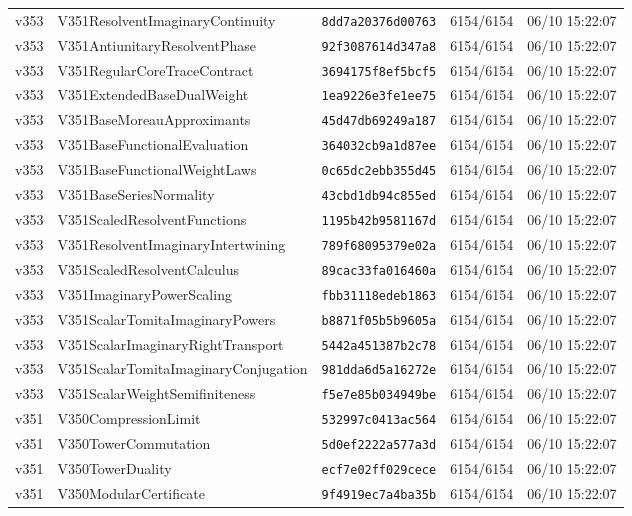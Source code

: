 \documentclass[11pt]{article}
\theoremstyle{definition}\newtheorem{deriv}{Derivation}
\begin{document}
{\begin{longtable}{@{}lllll@{}}
v353 & V351ResolventImaginaryContinuity & \texttt{8dd7a20376d00763} & 6154/6154 & 06/10 15:22:07 \\
v353 & V351AntiunitaryResolventPhase & \texttt{92f3087614d347a8} & 6154/6154 & 06/10 15:22:07 \\
v353 & V351RegularCoreTraceContract & \texttt{3694175f8ef5bcf5} & 6154/6154 & 06/10 15:22:07 \\
v353 & V351ExtendedBaseDualWeight & \texttt{1ea9226e3fe1ee75} & 6154/6154 & 06/10 15:22:07 \\
v353 & V351BaseMoreauApproximants & \texttt{45d47db69249a187} & 6154/6154 & 06/10 15:22:07 \\
v353 & V351BaseFunctionalEvaluation & \texttt{364032cb9a1d87ee} & 6154/6154 & 06/10 15:22:07 \\
v353 & V351BaseFunctionalWeightLaws & \texttt{0c65dc2ebb355d45} & 6154/6154 & 06/10 15:22:07 \\
v353 & V351BaseSeriesNormality & \texttt{43cbd1db94c855ed} & 6154/6154 & 06/10 15:22:07 \\
v353 & V351ScaledResolventFunctions & \texttt{1195b42b9581167d} & 6154/6154 & 06/10 15:22:07 \\
v353 & V351ResolventImaginaryIntertwining & \texttt{789f68095379e02a} & 6154/6154 & 06/10 15:22:07 \\
v353 & V351ScaledResolventCalculus & \texttt{89cac33fa016460a} & 6154/6154 & 06/10 15:22:07 \\
v353 & V351ImaginaryPowerScaling & \texttt{fbb31118edeb1863} & 6154/6154 & 06/10 15:22:07 \\
v353 & V351ScalarTomitaImaginaryPowers & \texttt{b8871f05b5b9605a} & 6154/6154 & 06/10 15:22:07 \\
v353 & V351ScalarImaginaryRightTransport & \texttt{5442a451387b2c78} & 6154/6154 & 06/10 15:22:07 \\
v353 & V351ScalarTomitaImaginaryConjugation & \texttt{981dda6d5a16272e} & 6154/6154 & 06/10 15:22:07 \\
v353 & V351ScalarWeightSemifiniteness & \texttt{f5e7e85b034949be} & 6154/6154 & 06/10 15:22:07 \\
v351 & V350CompressionLimit & \texttt{532997c0413ac564} & 6154/6154 & 06/10 15:22:07 \\
v351 & V350TowerCommutation & \texttt{5d0ef2222a577a3d} & 6154/6154 & 06/10 15:22:07 \\
v351 & V350TowerDuality & \texttt{ecf7e02ff029cece} & 6154/6154 & 06/10 15:22:07 \\
v351 & V350ModularCertificate & \texttt{9f4919ec7a4ba35b} & 6154/6154 & 06/10 15:22:07 \\

\end{longtable}}
\end{document}

